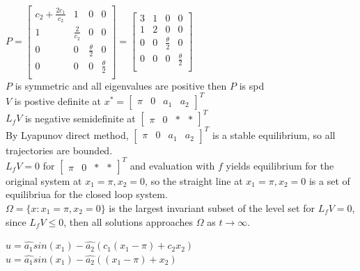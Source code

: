 \documentclass[12pt,letter]{article}
\begin{document}
\begin{itemize}
$P=
\begin{bmatrix}
  c_2+\frac{2c_1}{c_2} & 1 & 0 & 0 \\
  1 & \frac{2}{c_2} & 0 & 0 \\
  0 & 0 & \frac{\theta}{2} & 0\\
  0 & 0 & 0 & \frac{\theta}{2}\\
\end{bmatrix}
=
\begin{bmatrix}
  3 & 1 & 0 & 0 \\
  1 & 2 & 0 & 0 \\
  0 & 0 & \frac{\theta}{2} & 0\\
  0 & 0 & 0 & \frac{\theta}{2}\\
\end{bmatrix}
$\\

$P$ is symmetric and all eigenvalues are positive then $P$ is spd\\

$V$ is postive definite at $x^*=\begin{bmatrix} \pi & 0 & a_1 & a_2 \end{bmatrix}^T$\\

$L_f V$ is negative semidefinite at $\begin{bmatrix} \pi & 0 & * & * \end{bmatrix}^T$\\

By Lyapunov direct method, $\begin{bmatrix}
  \pi & 0 & a_1 & a_2
\end{bmatrix}^T$ is a stable equilibrium, so all trajectories are bounded.\\

$L_fV = 0$ for
$\begin{bmatrix}
  \pi & 0 & * & *
\end{bmatrix}^T$ and evaluation with $f$ yields equilibrium for the original system at $x_1=\pi, x_2=0$, so the straight line at $x_1=\pi, x_2=0$ is a set of equilibriua for the closed loop system.\\

$\Omega=\{x: x_1=\pi, x_2=0\}$ is the largest invariant subset of the level set for $L_fV=0$, since $L_fV \leq 0$, then all solutions approaches $\Omega$ as $t \to \infty$.

$u=\hat{a_1}sin(x_1)-\hat{a_2}(c_1 (x_1-\pi) + c_2 x_2 )$\\
$u=\hat{a_1}sin(x_1)-\hat{a_2}((x_1-\pi) + x_2)$\\


\end{itemize}
\end{document}
